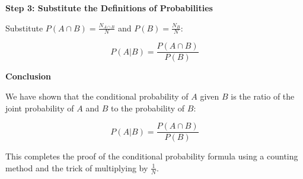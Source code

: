 \documentclass{article}
\begin{document}
\textbf{Step 3: Substitute the Definitions of Probabilities}

Substitute \( P(A \cap B) = \frac{N_{A \cap B}}{N} \) and \( P(B) = \frac{N_B}{N} \):

\[
P(A|B) = \frac{P(A \cap B)}{P(B)}
\]

\textbf{Conclusion}

We have shown that the conditional probability of \( A \) given \( B \) is the ratio of the joint probability of \( A \) and \( B \) to the probability of \( B \):

\[
P(A|B) = \frac{P(A \cap B)}{P(B)}
\]

This completes the proof of the conditional probability formula using a counting method and the trick of multiplying by \( \frac{1}{N} \).
\end{document}
